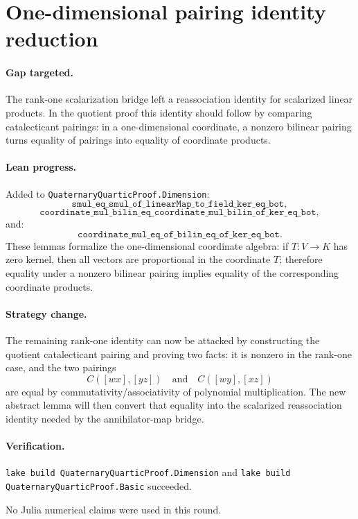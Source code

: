 \documentclass[11pt]{article}
\begin{document}
\section*{One-dimensional pairing identity reduction}

\paragraph{Gap targeted.}
The rank-one scalarization bridge left a reassociation identity for scalarized
linear products.  In the quotient proof this identity should follow by
comparing catalecticant pairings: in a one-dimensional coordinate, a nonzero
bilinear pairing turns equality of pairings into equality of coordinate
products.

\paragraph{Lean progress.}
Added to \texttt{QuaternaryQuarticProof.Dimension}:
\[
\texttt{smul\_eq\_smul\_of\_linearMap\_to\_field\_ker\_eq\_bot},
\]
\[
\texttt{coordinate\_mul\_bilin\_eq\_coordinate\_mul\_bilin\_of\_ker\_eq\_bot},
\]
and:
\[
\texttt{coordinate\_mul\_eq\_of\_bilin\_eq\_of\_ker\_eq\_bot}.
\]
These lemmas formalize the one-dimensional coordinate algebra: if \(T:V\to K\)
has zero kernel, then all vectors are proportional in the coordinate \(T\);
therefore equality under a nonzero bilinear pairing implies equality of the
corresponding coordinate products.

\paragraph{Strategy change.}
The remaining rank-one identity can now be attacked by constructing the
quotient catalecticant pairing and proving two facts: it is nonzero in the
rank-one case, and the two pairings
\[
C([wx],[yz]) \quad\text{and}\quad C([wy],[xz])
\]
are equal by commutativity/associativity of polynomial multiplication.  The
new abstract lemma will then convert that equality into the scalarized
reassociation identity needed by the annihilator-map bridge.

\paragraph{Verification.}
\texttt{lake build QuaternaryQuarticProof.Dimension} and
\texttt{lake build QuaternaryQuarticProof.Basic} succeeded.

No Julia numerical claims were used in this round.
\end{document}
